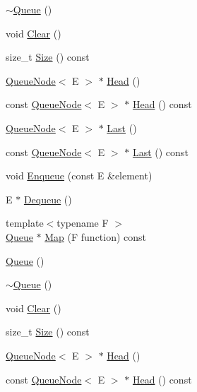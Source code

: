 \begin{DoxyCompactItemize}
\item 
\mbox{\hyperlink{class_queue_a49fe82adb8dc2fb62ab53876a6933d0f}{$\sim$\+Queue}} ()
\item 
void \mbox{\hyperlink{class_queue_acfdd5f9f7e936ca30dcf877370ef9510}{Clear}} ()
\item 
size\+\_\+t \mbox{\hyperlink{class_queue_abc4d78b5f66041011c5590bf703847b0}{Size}} () const
\item 
\mbox{\hyperlink{class_queue_node}{Queue\+Node}}$<$ E $>$ $\ast$ \mbox{\hyperlink{class_queue_a71aa0154ef75bb87a53b6af1829fcd5e}{Head}} ()
\item 
const \mbox{\hyperlink{class_queue_node}{Queue\+Node}}$<$ E $>$ $\ast$ \mbox{\hyperlink{class_queue_a6c906075e0ad2d1f0634990aa106395e}{Head}} () const
\item 
\mbox{\hyperlink{class_queue_node}{Queue\+Node}}$<$ E $>$ $\ast$ \mbox{\hyperlink{class_queue_a430aca3d3b9f5fd588b215028d134b74}{Last}} ()
\item 
const \mbox{\hyperlink{class_queue_node}{Queue\+Node}}$<$ E $>$ $\ast$ \mbox{\hyperlink{class_queue_a7c8c2c64700dfe1df8bf266572cf101a}{Last}} () const
\item 
void \mbox{\hyperlink{class_queue_abaa2e7175457307bca74f5562cbdaaa9}{Enqueue}} (const E \&element)
\item 
E $\ast$ \mbox{\hyperlink{class_queue_a434d465001c3078e999f7a89a8af84c0}{Dequeue}} ()
\item 
{\footnotesize template$<$typename F $>$ }\\\mbox{\hyperlink{class_queue}{Queue}} $\ast$ \mbox{\hyperlink{class_queue_a904a696292fc593adc6fd21fb229d760}{Map}} (F function) const
\item 
\mbox{\hyperlink{class_queue_ab09891e54b51dc677ee6efb350687ae4}{Queue}} ()
\item 
\mbox{\hyperlink{class_queue_a49fe82adb8dc2fb62ab53876a6933d0f}{$\sim$\+Queue}} ()
\item 
void \mbox{\hyperlink{class_queue_acfdd5f9f7e936ca30dcf877370ef9510}{Clear}} ()
\item 
size\+\_\+t \mbox{\hyperlink{class_queue_abc4d78b5f66041011c5590bf703847b0}{Size}} () const
\item 
\mbox{\hyperlink{class_queue_node}{Queue\+Node}}$<$ E $>$ $\ast$ \mbox{\hyperlink{class_queue_a71aa0154ef75bb87a53b6af1829fcd5e}{Head}} ()
\item 
const \mbox{\hyperlink{class_queue_node}{Queue\+Node}}$<$ E $>$ $\ast$ \mbox{\hyperlink{class_queue_a6c906075e0ad2d1f0634990aa106395e}{Head}} () const

\end{DoxyCompactItemize}
